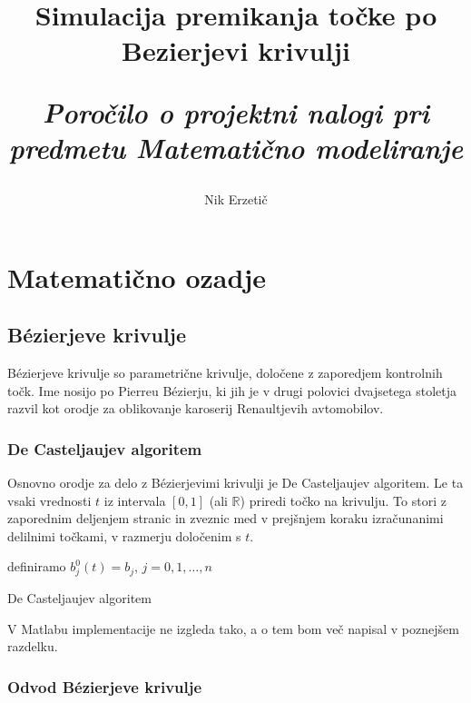 \documentclass[a4paper,12pt]{article}
\title{\textbf{\huge Simulacija premikanja točke po Bezierjevi krivulji}
	
	\Large \it Poročilo o projektni nalogi pri predmetu Matematično modeliranje}
\author{Nik Erzetič}
\begin{document}
	
	\maketitle
	
	\tableofcontents
	
	\section{Matematično ozadje}
	
	\subsection{B\'{e}zierjeve krivulje}
	
	B\'{e}zierjeve krivulje so parametrične krivulje, določene z zaporedjem kontrolnih točk. Ime nosijo po Pierreu B\'ezierju, ki jih je v drugi polovici dvajsetega stoletja razvil kot orodje za oblikovanje karoserij Renaultjevih avtomobilov.
	
	\subsubsection{De Casteljaujev algoritem}
	
	Osnovno orodje za delo z B\'ezierjevimi krivulji je De Casteljaujev algoritem. Le ta vsaki vrednosti $t$ iz intervala $[0,1]$ (ali $\mathbb{R}$) priredi točko na krivulju. To stori z zaporednim deljenjem stranic in zveznic med v prejšnjem koraku izračunanimi delilnimi točkami, v razmerju določenim s $t$. 
	
	\vspace{3mm}
	\begin{algorithm}[H]
		definiramo $b_j^0(t) = b_j$, $j=0,1,\ldots,n$
		
		\caption{De Casteljaujev algoritem}
	\end{algorithm}
	\vspace{3mm}
	
	V Matlabu implementacije ne izgleda tako, a o tem bom več napisal v poznejšem razdelku.
	
	\subsubsection{Odvod B\'{e}zierjeve krivulje}
	
\end{document}

